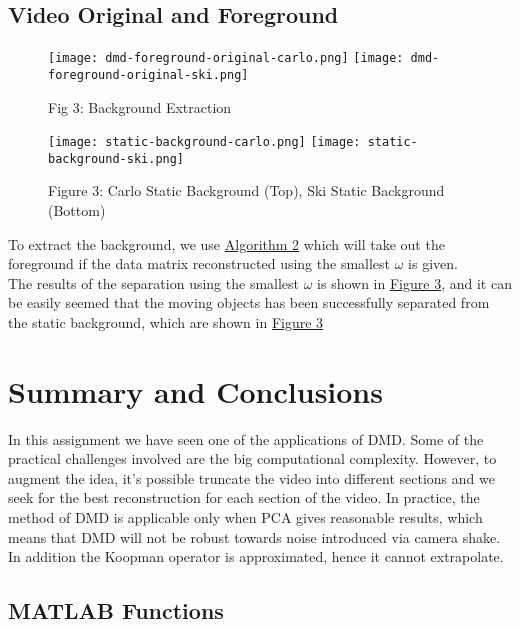 \documentclass{article}
\begin{document}
    \subsection*{Video Original and Foreground}
        \begin{figure}[h]
            \centering
            \texttt{[image: dmd-foreground-original-carlo.png]}
            \texttt{[image: dmd-foreground-original-ski.png]}
            \caption{Fig 3: Background Extraction}
        \label{fig:3}
        \end{figure}
            \begin{figure}[h]
            \centering
            \texttt{[image: static-background-carlo.png]}
            \texttt{[image: static-background-ski.png]}
            \caption{Figure 3: Carlo Static Background (Top), Ski Static Background (Bottom)}
            \label{fig:3}
        \end{figure}
        \hspace{1.1em}
        To extract the background, we use \hyperref[alg:2]{Algorithm 2} which will take out the foreground if the data matrix reconstructed using the smallest $\omega$ is given. 
        \\
        The results of the separation using the smallest $\omega$ is shown in \hyperref[fig:3]{Figure 3}, and it can be easily seemed that the moving objects has been successfully separated from the static background, which are shown in \hyperref[fig:3]{Figure 3}
        
\section{Summary and Conclusions}
    \hspace{1.1em}
    In this assignment we have seen one of the applications of DMD. Some of the practical challenges involved are the big computational complexity. However, to augment the idea, it's possible truncate the video into different sections and we seek for the best reconstruction for each section of the video. In practice, the method of DMD is applicable only when PCA gives reasonable results, which means that DMD will not be robust towards noise introduced via camera shake. In addition the Koopman operator is approximated, hence it cannot extrapolate. 
   
\printbibliography

\begin{appendices}

\section{MATLAB Functions}

    
\end{appendices}
\end{document}
